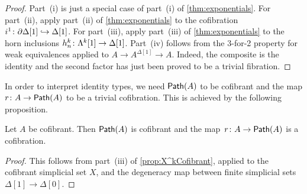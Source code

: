 \documentclass[reqno,10pt,a4paper,oneside,draft]{amsart}
\begin{document}
\begin{proof}
Part~(i) is just a special case of part~(i) of \cref{thm:exponentials}. For part~(ii), apply part~(ii) of \cref{thm:exponentials} to the cofibration $i^1 \colon \partial \Delta[1]  \hookrightarrow \Delta[1]$. For part~(iii), apply part~(iii) of \cref{thm:exponentials} to the horn inclusions $h^k_n \colon \Lambda^k[1]  \rightarrow \Delta[1]$. Part~(iv) follows from the 3-for-2 property for weak equivalences applied to $A \rightarrow A^{\Delta[1]} \rightarrow A$. Indeed, the
composite is the identity and the second factor has just been proved to be a trivial fibration.
\end{proof}


In order to interpret identity types, we need $\mathsf{Path}(A)$ to be cofibrant and the map $r \colon A \rightarrow \mathsf{Path}(A)$ to be a trivial cofibration. This is achieved by the following proposition.

\begin{proposition}\label{proposition:PathObjectCofibrant}
Let $A$ be cofibrant. Then $\mathsf{Path}(A)$ is cofibrant and the map~$r \colon A \rightarrow \mathsf{Path}(A)$ is a cofibration.
\end{proposition}



\begin{proof}
This follows from part~(iii) of \cref{prop:X^kCofibrant}, applied to the cofibrant simplicial set $X$, and the degeneracy map between finite simplicial sets $\Delta[1] \rightarrow \Delta[0]$. 
\end{proof}



\end{document}

